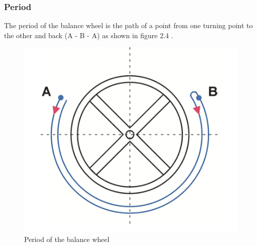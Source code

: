 \documentclass[12pt, a4paper]{report}
\begin{document}
\subsubsection{Period}
The period of the balance wheel is the path of a point from one turning point to the other and back (A - B - A) as shown in figure 2.4 \cite[p. 9]{Witschi_basics}.
    \begin{figure}[H]
    \centering
    \includegraphics[scale=0.4]{Images/period.png}
    
    \caption{Period of the balance wheel \cite[p. 9]{Witschi_basics}}
    \end{figure}
\bigskip
\end{document}
